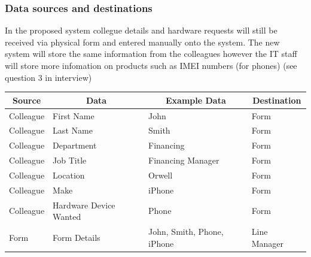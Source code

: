 \subsubsection{Data sources and destinations}

In the proposed system collegue details and hardware requests will still be received via physical form and entered manually onto the system. The new system will store the same information from the colleagues however the IT staff will store more infomation on products such as IMEI numbers (for phones) (see question 3 in interview)

\begin{longtable}{|p{3cm}|p{3cm}|p{3cm}|p{3cm}|}
\hline
\multicolumn{1}{|c|}{\textbf{Source}} & \multicolumn{1}{c|}{\textbf{Data}} & \multicolumn{1}{c|}{\textbf{Example Data}}         & \multicolumn{1}{c|}{\textbf{Destination}} \\ \hline
Colleague                             & First Name                         & John                                               & Form                                      \\ \hline
Colleague                             & Last Name                          & Smith                                              & Form                                      \\ \hline
Colleague                             & Department                              & Financing                                            & Form                                      \\ \hline
Colleague                             & Job Title                              & Financing Manager                                          & Form                                      \\ \hline
Colleague                             & Location                              & Orwell                                            & Form                                      \\ \hline
Colleague                             & Make                              & iPhone                                             & Form                                      \\ \hline
Colleague                             & Hardware Device Wanted             & Phone                                              & Form                                      \\ \hline
Form                                  & Form Details                       & John, Smith, Phone, iPhone                & Line Manager                              \\ \hline

\end{longtable}
